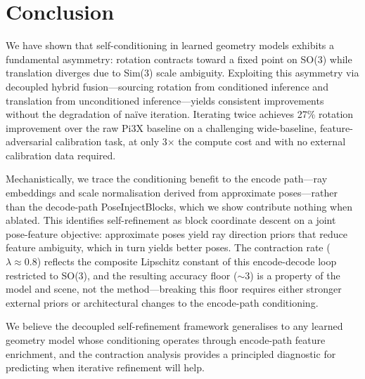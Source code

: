 \section{Conclusion}
\label{sec:conclusion}

We have shown that self-conditioning in learned geometry models exhibits a fundamental asymmetry: rotation contracts toward a fixed point on SO(3) while translation diverges due to Sim(3) scale ambiguity. Exploiting this asymmetry via decoupled hybrid fusion---sourcing rotation from conditioned inference and translation from unconditioned inference---yields consistent improvements without the degradation of na\"ive iteration. Iterating twice achieves 27\% rotation improvement over the raw Pi3X baseline on a challenging wide-baseline, feature-adversarial calibration task, at only 3$\times$ the compute cost and with no external calibration data required.

Mechanistically, we trace the conditioning benefit to the encode path---ray embeddings and scale normalisation derived from approximate poses---rather than the decode-path PoseInjectBlocks, which we show contribute nothing when ablated. This identifies self-refinement as block coordinate descent on a joint pose-feature objective: approximate poses yield ray direction priors that reduce feature ambiguity, which in turn yields better poses. The contraction rate ($\lambda \approx 0.8$) reflects the composite Lipschitz constant of this encode-decode loop restricted to SO(3), and the resulting accuracy floor ($\sim$3\degree{}) is a property of the model and scene, not the method---breaking this floor requires either stronger external priors or architectural changes to the encode-path conditioning.

We believe the decoupled self-refinement framework generalises to any learned geometry model whose conditioning operates through encode-path feature enrichment, and the contraction analysis provides a principled diagnostic for predicting when iterative refinement will help.

